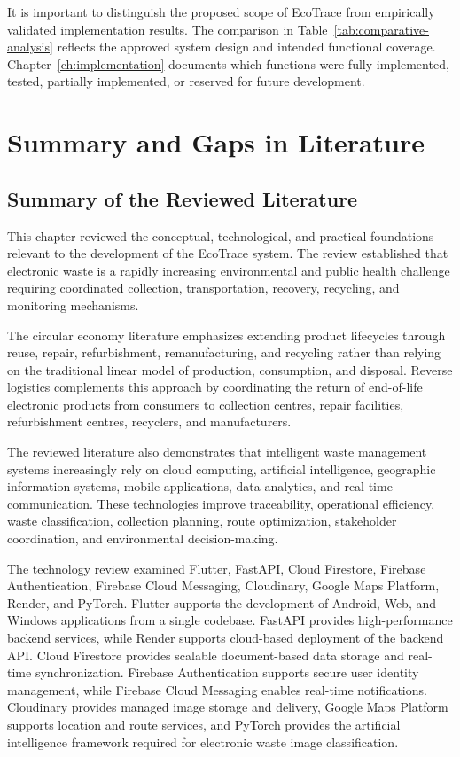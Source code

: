 It is important to distinguish the proposed scope of EcoTrace from empirically
validated implementation results. The comparison in Table~\ref{tab:comparative-analysis}
reflects the approved system design and intended functional coverage.
Chapter~\ref{ch:implementation} documents which functions were fully
implemented, tested, partially implemented, or reserved for future development.

\section{Summary and Gaps in Literature}

\subsection{Summary of the Reviewed Literature}

This chapter reviewed the conceptual, technological, and practical foundations
relevant to the development of the EcoTrace system. The review established that
electronic waste is a rapidly increasing environmental and public health challenge
requiring coordinated collection, transportation, recovery, recycling, and
monitoring mechanisms.

The circular economy literature emphasizes extending product lifecycles
through reuse, repair, refurbishment, remanufacturing, and recycling rather than
relying on the traditional linear model of production, consumption, and disposal.
Reverse logistics complements this approach by coordinating the return of
end-of-life electronic products from consumers to collection centres, repair
facilities, refurbishment centres, recyclers, and manufacturers.

The reviewed literature also demonstrates that intelligent waste management
systems increasingly rely on cloud computing, artificial intelligence, geographic
information systems, mobile applications, data analytics, and real-time
communication. These technologies improve traceability, operational efficiency,
waste classification, collection planning, route optimization, stakeholder
coordination, and environmental decision-making.

The technology review examined Flutter, FastAPI, Cloud Firestore, Firebase
Authentication, Firebase Cloud Messaging, Cloudinary, Google Maps Platform,
Render, and PyTorch. Flutter supports the development of Android, Web, and
Windows applications from a single codebase. FastAPI provides high-performance
backend services, while Render supports cloud-based deployment of the backend
API. Cloud Firestore provides scalable document-based data storage and
real-time synchronization. Firebase Authentication supports secure user identity
management, while Firebase Cloud Messaging enables real-time notifications.
Cloudinary provides managed image storage and delivery, Google Maps Platform
supports location and route services, and PyTorch provides the artificial
intelligence framework required for electronic waste image classification.

